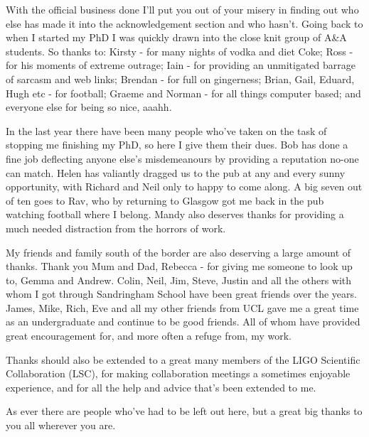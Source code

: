 With the official business done I'll put you out of your misery in finding out who else has made it
into the acknowledgement section and who hasn't. Going back to when I started my PhD I was quickly
drawn into the close knit group of A\&A students. So thanks to: Kirsty - for many nights of vodka
and diet Coke; Ross - for his moments of extreme outrage; Iain - for providing an unmitigated
barrage of sarcasm and web links; Brendan - for full on gingerness; Brian, Gail, Eduard, Hugh etc -
for football; Graeme and Norman - for all things computer based; and everyone else for being so
nice, aaahh.

In the last year there have been many people who've taken on the task of stopping me finishing my
PhD, so here I give them their dues. Bob has done a fine job deflecting anyone else's misdemeanours
by providing a reputation no-one can match. Helen has valiantly dragged us to the pub at any and
every sunny opportunity, with Richard and Neil only to happy to come along. A big seven out of ten
goes to Rav, who by returning to Glasgow got me back in the pub watching football where I belong.
Mandy also deserves thanks for providing a much needed distraction from the horrors of work. 

My friends and family south of the border are also deserving a large amount of thanks. Thank you Mum
and Dad, Rebecca - for giving me someone to look up to, Gemma and Andrew. Colin, Neil, Jim, Steve,
Justin and all the others with whom I got through Sandringham School have been great friends over
the years. James, Mike, Rich, Eve and all my other friends from UCL gave me a great time as an
undergraduate and continue to be good friends. All of whom have provided great encouragement for,
and more often a refuge from, my work.

Thanks should also be extended to a great many members of the LIGO Scientific Collaboration (LSC),
for making collaboration meetings a sometimes enjoyable experience, and for all the help and
advice that's been extended to me.

As ever there are people who've had to be left out here, but a great big thanks to you all wherever
you are.